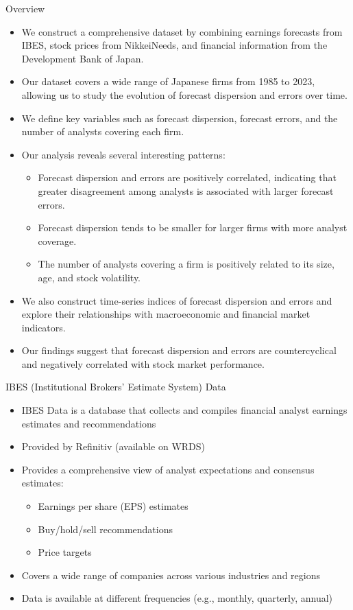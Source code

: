 \documentclass[aspectratio=169]{beamer}
\begin{document}
\begin{frame}{Overview}
\begin{itemize}
    \item We construct a comprehensive dataset by combining earnings forecasts from IBES, stock prices from NikkeiNeeds, and financial information from the Development Bank of Japan.
    \item Our dataset covers a wide range of Japanese firms from 1985 to 2023, allowing us to study the evolution of forecast dispersion and errors over time.
    \item We define key variables such as forecast dispersion, forecast errors, and the number of analysts covering each firm.
    \item Our analysis reveals several interesting patterns:
    \begin{itemize}
        \item Forecast dispersion and errors are positively correlated, indicating that greater disagreement among analysts is associated with larger forecast errors.
        \item Forecast dispersion tends to be smaller for larger firms with more analyst coverage.
        \item The number of analysts covering a firm is positively related to its size, age, and stock volatility.
    \end{itemize}
    \item We also construct time-series indices of forecast dispersion and errors and explore their relationships with macroeconomic and financial market indicators.
    \item Our findings suggest that forecast dispersion and errors are countercyclical and negatively correlated with stock market performance.
\end{itemize}
\end{frame}


\begin{frame}{IBES (Institutional Brokers' Estimate System) Data }
  \begin{itemize}
    \item IBES Data is a database that collects and compiles financial analyst earnings estimates and recommendations
    \item Provided by Refinitiv (available on WRDS)
    \item Provides a comprehensive view of analyst expectations and consensus estimates:
    \begin{itemize}
      \item Earnings per share (EPS) estimates
      \item Buy/hold/sell recommendations
      \item Price targets
    \end{itemize}
    \item Covers a wide range of companies across various industries and regions
    \item Data is available at different frequencies (e.g., monthly, quarterly, annual)
  \end{itemize}
\end{frame}
\end{document}
